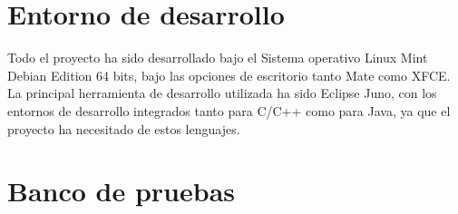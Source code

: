 \section{Entorno de desarrollo}
Todo el proyecto ha sido desarrollado bajo el Sistema operativo Linux Mint Debian Edition 64 bits, bajo las opciones de escritorio tanto Mate como XFCE.\\

La principal herramienta de desarrollo utilizada ha sido Eclipse Juno, con los entornos de desarrollo integrados tanto para C/C++ como para Java, ya que el proyecto ha necesitado de estos lenguajes.\\
\section{Banco de pruebas}
